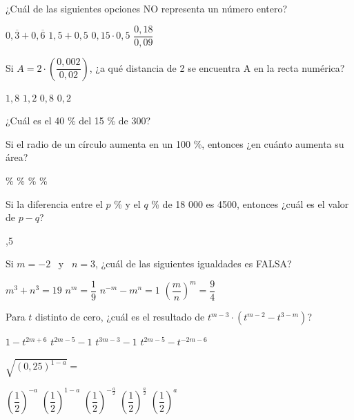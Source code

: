 \documentclass[revolver]{srs}
\begin{document}
\begin{preguntas}[after-item-skip=2cm]
\pregunta ¿Cuál de las siguientes opciones NO representa un número entero?
\begin{vertical}
\alternativa $0,\overline{3}+0,\overline{6}$
\alternativa $1,5+0,5$
\alternativa $0,15\cdot 0,5$
\alternativa $\dfrac{0,18}{0,09}$
\end{vertical}

\pregunta Si $A = 2 \cdot \left(\dfrac{0,002}{0,02}\right)$, ¿a qué distancia de 2 se encuentra A en la recta numérica?
\begin{vertical}
\alternativa $1,8$
\alternativa $1,2$
\alternativa $0,8$
\alternativa $0,2$
\end{vertical}

\pregunta ¿Cuál es el 40 \% del 15 \% de 300?
\begin{vertical}
\end{vertical}

\pregunta Si el radio de un círculo aumenta en un 100 \%, entonces ¿en cuánto aumenta su área?
\begin{vertical}
 \%
 \%
 \%
 \%
\end{vertical}

\pregunta Si la diferencia entre el $p$ \% y el $q$ \% de 18 000 es 4500, entonces ¿cuál es el valor de $p-q$?
\begin{vertical}
,5
\end{vertical}

\pregunta Si $m=-2$ ~y~ $n=3$, ¿cuál de las siguientes igualdades es FALSA?
\begin{vertical}
\alternativa $m^3+n^3=19$
\alternativa $n^m = \dfrac{1}{9}$
\alternativa $n^{-m}-m^n=1$
\alternativa $\left(\dfrac{m}{n}\right)^m = \dfrac{9}{4}$
\end{vertical}

\pregunta Para $t$ distinto de cero, ¿cuál es el resultado de $t^{m-3}\cdot\left(t^{m-2}-t^{3-m}\right)$?
\begin{vertical}
\alternativa $1-t^{2m+6}$
\alternativa $t^{2m-5}-1$
\alternativa $t^{3m-3}-1$
\alternativa $t^{2m-5}-t^{-2m-6}$
\end{vertical}

\pregunta $\sqrt{\left(0,25\right)^{1-a}} =$
\begin{vertical}
\alternativa $\left(\dfrac{1}{2}\right)^{-a}$
\alternativa $\left(\dfrac{1}{2}\right)^{1-a}$
\alternativa $\left(\dfrac{1}{2}\right)^{-\frac{a}{2}}$
\alternativa $\left(\dfrac{1}{2}\right)^{\frac{a}{2}}$
\alternativa $\left(\dfrac{1}{2}\right)^{a}$
\end{vertical}


\end{preguntas}
\end{document}
